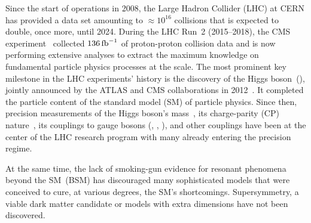 \documentclass[a4paper,11pt]{article}
\newcommand{\Pb}{{{\Pqb}}\xspace}
\newcommand{\Pt}{{{\Pqt}}\xspace}
\newcommand{\Ps}{{{\Pqs}}\xspace}
\newcommand{\Pc}{{{\Pqc}}\xspace}
\newcommand{\Pd}{{{\Pqd}}\xspace}
\newcommand{\Pu}{{{\Pqu}}\xspace}
\begin{document}
Since the start of operations in 2008, the Large Hadron Collider (LHC) at CERN has provided a data set amounting to $\approx10^{16}$ collisions that is expected to double, once more, until 2024.
During the LHC Run~2 (2015--2018), the CMS experiment~\cite{CMS_ex} collected  $136\mbox{\ensuremath{\,\text{fb}^{-1}}}$ of proton-proton collision data  and is now performing extensive analyses to extract the maximum knowledge on fundamental particle physics processes at the \TeV scale.
The most prominent key milestone in the LHC experiments' history is the discovery of the Higgs boson~(\PH), jointly announced by the ATLAS and CMS collaborations in 2012~\cite{Aad:2012tfa,Chatrchyan:2012ufa}.
It completed the particle content of the standard model (SM) of particle physics. 
Since then, precision measurements of the Higgs boson's mass~\cite{CMS:2017dib,CMS:2020xrn}, its charge-parity (CP) nature~\cite{CMS:2019jdw,CMS:2020cga}, its couplings to gauge bosons (\PW, \PZ, \Pgg), and other couplings have been at the center of the LHC research program with many already entering the precision regime.

At the same time, the lack of smoking-gun evidence for resonant phenomena beyond the SM~(BSM) has discouraged many sophisticated models that were conceived to cure, at various degrees, the SM's shortcomings. Supersymmetry, a viable dark matter candidate or models with extra dimensions have not been discovered. 
\end{document}
